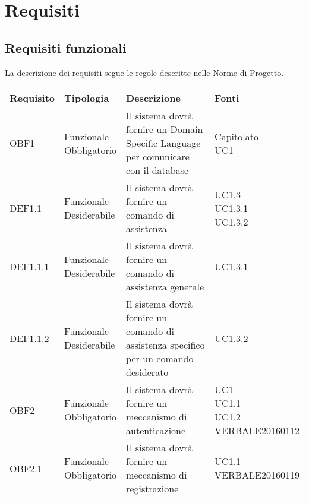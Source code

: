 \documentclass{scalatekids-article}
\begin{document}
\section{Requisiti}
\subsection{Requisiti funzionali}
La descrizione dei requisiti segue le regole descritte nelle \href{run:../Interni/NormeDiProgetto\_v1.0.0.pdf}{Norme di Progetto}.
\begin{longtable}[H]{|l|p{2cm}|p{6cm}|p{4cm}|}
  \hline
  \textbf{Requisito} & \textbf{Tipologia} & \textbf{Descrizione} & \textbf{Fonti}\\
  \hline
  OBF1 & \multiLineCell{Funzionale\\Obbligatorio} & Il sistema dovrà fornire un Domain Specific Language per comunicare con il database & \multiLineCell{Capitolato\\UC1\\}\\
  \hline
  DEF1.1 & \multiLineCell{Funzionale\\Desiderabile} & Il sistema dovrà fornire un comando di assistenza & \multiLineCell{UC1.3\\UC1.3.1\\UC1.3.2\\}\\
  \hline
  DEF1.1.1 & \multiLineCell{Funzionale\\Desiderabile} & Il sistema dovrà fornire un comando di assistenza generale & \multiLineCell{UC1.3.1\\}\\
  \hline
  DEF1.1.2 & \multiLineCell{Funzionale\\Desiderabile} & Il sistema dovrà fornire un comando di assistenza specifico per un comando desiderato & \multiLineCell{UC1.3.2\\}\\
  \hline
  OBF2 & \multiLineCell{Funzionale\\Obbligatorio} & Il sistema dovrà fornire un meccanismo di autenticazione & \multiLineCell{UC1\\UC1.1\\UC1.2\\VERBALE20160112\\}\\
  \hline
  OBF2.1 & \multiLineCell{Funzionale\\Obbligatorio} & Il sistema dovrà fornire un meccanismo di registrazione & \multiLineCell{UC1.1\\VERBALE20160119\\}\\

\end{longtable}
\end{document}
